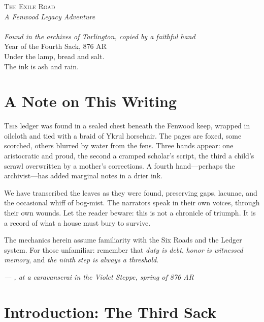 \documentclass[11pt,a5paper]{book}
\begin{document}
\frontmatter
\thispagestyle{empty}
\begin{center}
\vspace*{2cm}
{\Huge\scshape The Exile Road}\\[1em]
{\Large\textit{A Fenwood Legacy Adventure}}\\[2em]
{\large\gray}\\[0.5em]
{\normalsize\textit{Found in the archives of Tarlington, copied by a faithful hand}}\\[2em]
\vfill
{\small Year of the Fourth Sack, 876 AR}\\[1em]
{\small Under the lamp, bread and salt.\\The ink is ash and rain.}
\end{center}

\clearpage

\tableofcontents

\clearpage

\chapter*{A Note on This Writing}

\lettrine{T}{his} ledger was found in a sealed chest beneath the Fenwood keep, wrapped in oilcloth and tied with a braid of Ykrul horsehair. The pages are foxed, some scorched, others blurred by water from the fens. Three hands appear: one aristocratic and proud, the second a cramped scholar's script, the third a child's scrawl overwritten by a mother's corrections. A fourth hand---perhaps the archivist---has added marginal notes in a drier ink.

We have transcribed the leaves as they were found, preserving gaps, lacunae, and the occasional whiff of bog-mist. The narrators speak in their own voices, through their own wounds. Let the reader beware: this is not a chronicle of triumph. It is a record of what a house must bury to survive.

The mechanics herein assume familiarity with the Six Roads and the Ledger system. For those unfamiliar: remember that \textit{duty is debt}, \textit{honor is witnessed memory}, and \textit{the ninth step is always a threshold}.

\vspace{1em}
\noindent\textit{--- \dusana, at a caravanserai in the Violet Steppe, spring of 876 AR}

\mainmatter

\chapter{Introduction: The Third Sack}
\end{document}
